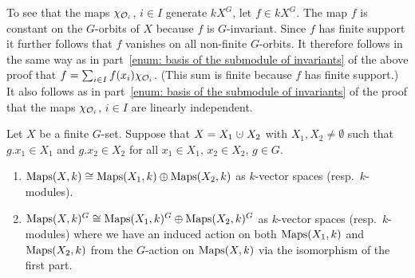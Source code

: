 \begin{fluff}
  To see that the maps $\chi_{\mathcal{O}_i}$, $i \in I$ generate $kX^G$, let $f \in kX^G$.
  The map $f$ is constant on the $G$-orbits of $X$ because $f$ is $G$-invariant.
  Since $f$ has finite support it further follows that $f$ vanishes on all non-finite $G$-orbits.
  It therefore follows in the same way as in part~\ref{enum: basis of the submodule of invariants} of the above proof that $f = \sum_{i \in I} f(x_i) \chi_{\mathcal{O}_i}$.
  (This sum is finite because $f$ has finite support.) 
  It also follows as in part~\ref{enum: basis of the submodule of invariants} of the proof that the maps $\chi_{\mathcal{O}_i}$, $i \in I$ are linearly independent.
\end{fluff}


\begin{lemma}
  Let $X$ be a finite $G$-set.
  Suppose that $X = X_1 \dotcup X_2$ with $X_1, X_2 \neq \emptyset$ such that $g.x_1 \in X_1$ and $g.x_2 \in X_2$ for all $x_1 \in X_1$, $x_2 \in X_2$, $g \in G$.
  \begin{enumerate}[label=\emph{\alph*)}]
    \item
      $\operatorname{Maps}(X,k) \cong \operatorname{Maps}(X_1, k) \oplus \operatorname{Maps}(X_2, k)$ as $k$-vector spaces (resp.\ $k$-modules).
    \item
      $\operatorname{Maps}(X,k)^G \cong \operatorname{Maps}(X_1, k)^G \oplus \operatorname{Maps}(X_2, k)^G$ as $k$-vector spaces (resp.\ $k$-modules) where we have an induced action on both $\operatorname{Maps}(X_1, k)$ and $\operatorname{Maps}(X_2, k)$ from the $G$-action on $\operatorname{Maps}(X,k)$ via the isomorphism of the first part.
  \end{enumerate}
\end{lemma}


